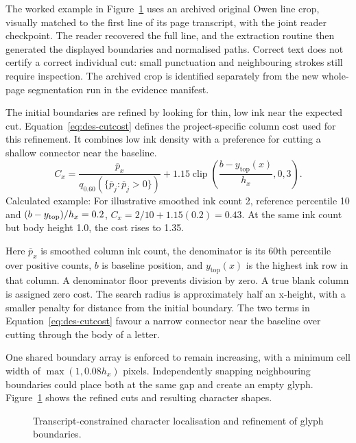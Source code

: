The worked example in Figure~\ref{fig:des-alignment} uses an archived original Owen line crop, visually matched to the first line of its page transcript, with the joint reader checkpoint. The reader recovered the full line, and the extraction routine then generated the displayed boundaries and normalised paths. Correct text does not certify a correct individual cut: small punctuation and neighbouring strokes still require inspection. The archived crop is identified separately from the new whole-page segmentation run in the evidence manifest.

The initial boundaries are refined by looking for thin, low ink near the expected cut. Equation~\ref{eq:des-cutcost} defines the project-specific column cost used for this refinement. It combines low ink density with a preference for cutting a shallow connector near the baseline.
\begin{equation}
C_x=\frac{\overline p_x}{q_{0.60}(\{\overline p_j:\overline p_j>0\})}
+1.15\operatorname{clip}\left(\frac{b-y_{\mathrm{top}}(x)}{h_x},0,3\right).
\label{eq:des-cutcost}
\end{equation}
Calculated example: For illustrative smoothed ink count 2, reference percentile 10 and $(b-y_{\rm top})/h_x=0.2$, $C_x=2/10+1.15(0.2)=0.43$. At the same ink count but body height 1.0, the cost rises to 1.35.

Here $\overline p_x$ is smoothed column ink count, the denominator is its 60th percentile over positive counts, $b$ is baseline position, and $y_{\mathrm{top}}(x)$ is the highest ink row in that column. A denominator floor prevents division by zero. A true blank column is assigned zero cost. The search radius is approximately half an x-height, with a smaller penalty for distance from the initial boundary. The two terms in Equation~\ref{eq:des-cutcost} favour a narrow connector near the baseline over cutting through the body of a letter.

One shared boundary array is enforced to remain increasing, with a minimum cell width of $\max(1,0.08h_x)$ pixels. Independently snapping neighbouring boundaries could place both at the same gap and create an empty glyph. Figure~\ref{fig:des-alignment} shows the refined cuts and resulting character shapes.


\begin{figure}[!htbp]\centering
{}
\caption{Transcript-constrained character localisation and refinement of glyph boundaries.}
\label{fig:des-alignment}
\end{figure}

